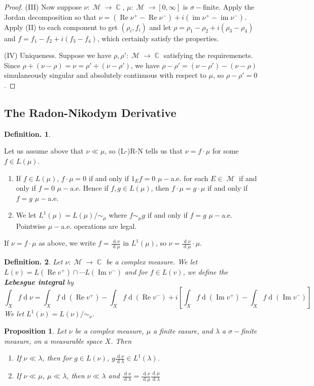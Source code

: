 \documentclass[12pt, a4paper]{memoir}
\DeclareMathOperator{\C}{{\mathbb{C}}}
\newtheorem{proposition}[theorem]{Proposition}
\theoremstyle{nonumberplain}
\newtheorem{definition}{Definition.}
\newtheorem{proof}{Proof}
\DeclareMathOperator{\im}{im}
\DeclareMathOperator{\M}{\mathcal{M}}
\renewcommand{\Re}{\ensuremath{\operatorname{Re}}}
\renewcommand{\Im}{\ensuremath{\operatorname{Im}}}
\renewcommand{\d}[1]{\ensuremath{\operatorname{d}\!{#1}}} %
\begin{document}
\begin{proof}
    (III) Now suppose $\nu:\M\to\C$, $\mu:\M\to[0,\infty]$ is $\sigma-$finite.
    Apply the Jordan decomposition so that $\nu=(\Re\nu^+-\Re\nu^-)+i(\im\nu^+-\im\nu^-)$.
    Apply (II) to each component to get $(\rho_i,f_i)$ and let $\rho=\rho_1-\rho_2+i(\rho_3-\rho_4)$ and $f=f_1-f_2+i(f_3-f_4)$, which certainly satisfy the properties.

    (IV) Uniqueness.
    Suppose we have $\rho,\rho':\M\to\C$ satisfying the requiremenets.
    Since $\rho+(\nu-\rho)=\nu=\rho'+(\nu-\rho')$, we have $\rho-\rho'=(\nu-\rho')-(\nu-\rho)$ simulaneously singular and absolutely continuous with respect to $\mu$, so $\rho-\rho'=0$.
\end{proof}
\subsection{The Radon-Nikodym Derivative}
\begin{definition}
\end{definition}
Let us assume above that $\nu\ll\mu$, so (L-)R-N tells us that $\nu=f\cdot\mu$ for some $f\in L(\mu)$.
\begin{enumerate}
    \item If $f\in L(\mu)$, $f\cdot\mu=0$ if and only if $1_Ef=0$ $\mu-$a.e. for each $E\in\M$ if and only if $f=0$ $\mu-$a.e.
        Hence if $f,g\in L(\mu)$, then $f\cdot\mu=g\cdot\mu$ if and only if $f=g$ $\mu-$a.e.
    \item We let $L^1(\mu)=L(\mu)/\sim_\mu$ where $f\sim_\mu g$ if and only if $f=g$ $\mu-$a.e.
        Pointwise $\mu-$a.e. operations are legal.
\end{enumerate}
If $\nu=f\cdot\mu$ as above, we write $f=\frac{\d{\nu}}{\d{\mu}}$ in $L^1(\mu)$, so $\nu=\frac{\d{\nu}}{\d{\mu}}\cdot\mu$.
\begin{definition}
    Let $\nu:\M\to\C$ be a complex measure.
    We let $L(v)=L(\Re v^+)\cap\cdots L(\Im v^-)$ and for $f\in L(v)$, we define the \textbf{Lebesgue integral} by
    \begin{equation*}
        \int_X f\d{\nu}=\int_X f\d{(\Re v^+)}-\int_X f\d{(\Re v^-)}+i\left[\int_X f\d{(\Im v^+)}-\int_X f\d{(\Im v^-)}\right]
    \end{equation*}
    We let $L^1(\nu)=L(\nu)/\sim_\nu$.
\end{definition}
\begin{proposition}
    Let $\nu$ be a complex measure, $\mu$ a finite easure, and $\lambda$ a $\sigma-$finite measure, on a measurable space $X$.
    Then
    \begin{enumerate}[nolistsep,label=(\roman*)]
        \item If $\nu\ll\lambda$, then for $g\in L(\nu)$, $g\frac{\d{\nu}}{\d{\lambda}}\in L^1(\lambda)$.
        \item If $\nu\ll\mu$, $\mu\ll\lambda$, then $\nu\ll\lambda$ and $\frac{\d{\nu}}{\d{\lambda}}=\frac{\d{\nu}}{\d{\mu}}\frac{\d{\mu}}{\d{\lambda}}$
    \end{enumerate}
\end{proposition}
\end{document}
